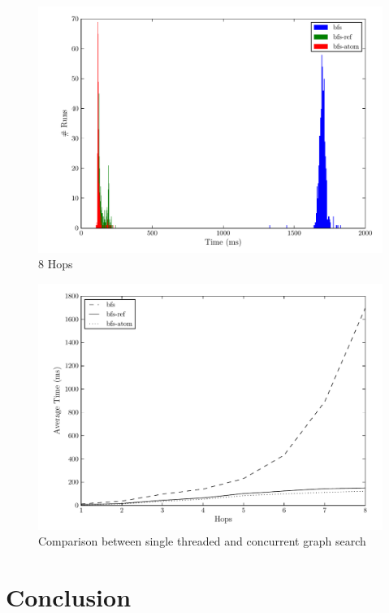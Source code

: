 \documentclass[12pt,letterpaper,oneside,notitlepage]{report}
\theoremstyle{definition}
\begin{document}
		\begin{figure}[!ht]
			\centering
			\includegraphics[scale=0.85]{8_hops}
			\caption{8 Hops}
			\label{fig:perf-8-hops}
		\end{figure}
		
		\begin{figure}[!ht]
			\centering
			\includegraphics[scale=0.85]{growth}
			\caption{Comparison between single threaded and concurrent graph search}
			\label{fig:perf-growth}
		\end{figure}
	
	\chapter{Conclusion}
		\cite{rob-java-bench-08}
	
	\appendix
	
	\singlespacing
	
	
	
	\printbibliography
	
	\todos
\end{document}

